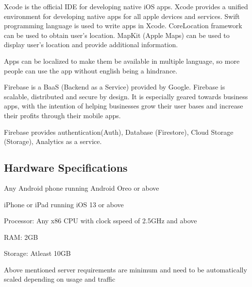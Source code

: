 \documentclass[../Report.tex]{subfiles}
\begin{document}
\begin{description}
  \item[Xcode: ] Xcode is the official IDE for developing native iOS apps. Xcode provides a unified environment for developing native apps 
  for all apple devices and services. Swift programming language is used to write apps in Xcode. CoreLocation framework can be used to 
  obtain user's location. MapKit (Apple Maps) can be used to display user's location and provide additional information.\par

  \item Apps can be localized to make them be available in multiple language, so more people can use the app without english being a 
  hindrance.

  \item[Firebase: ] Firebase is a BaaS (Backend as a Service) provided by Google. Firebase is scalable, distributed and secure by design. It is especially
  geared towards business apps, with the intention of helping businesses grow their user bases and increase their profits through their mobile apps.\par
  Firebase provides authentication(Auth), Database (Firestore), Cloud Storage (Storage), Analytics as a service.
\end{description}

\subsection{Hardware Specifications}
\begin{description}
  \item[User Device Requirements: ]
  \item Any Android phone running Android Oreo or above
  \item iPhone or iPad running iOS 13 or above
  \item 
  
  \item [Minimum Server Requirements: ]
  \item Processor: Any x86 CPU with clock sspeed of 2.5GHz and above
  \item RAM: 2GB
  \item Storage: Atleast 10GB
\end{description}
Above mentioned server requirements are minimum and need to be automatically scaled depending on usage and traffic
\end{document}
